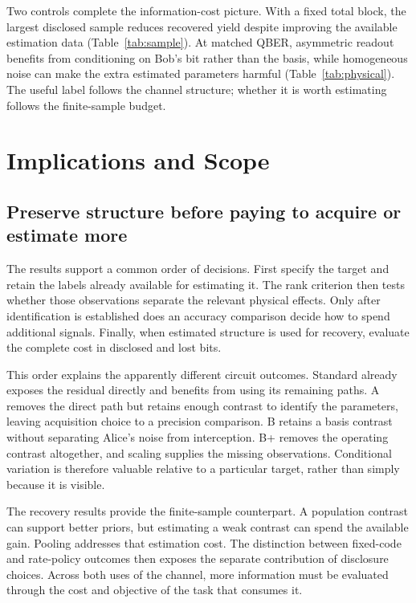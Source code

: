 \documentclass[manuscript,screen,review,anonymous]{acmart}
\begin{document}
Two controls complete the information-cost picture. With a fixed total block,
the largest disclosed sample reduces recovered yield despite improving the
available estimation data (Table~\ref{tab:sample}). At matched QBER,
asymmetric readout benefits from conditioning on Bob's bit rather than the
basis, while homogeneous noise can make the extra estimated parameters
harmful (Table~\ref{tab:physical}). The useful label follows the channel
structure; whether it is worth estimating follows the finite-sample budget.

\FloatBarrier
\section{Implications and Scope}
\label{sec:discussion}
\subsection{Preserve structure before paying to acquire or estimate more}
The results support a common order of decisions. First specify the target and
retain the labels already available for estimating it. The rank criterion then
tests whether those observations separate the relevant physical effects.
Only after identification is established does an accuracy comparison decide
how to spend additional signals. Finally, when estimated structure is used
for recovery, evaluate the complete cost in disclosed and lost bits.

This order explains the apparently different circuit outcomes. Standard
already exposes the residual directly and benefits from using its remaining
paths. A removes the direct path but retains enough contrast to identify the
parameters, leaving acquisition choice to a precision comparison.
B retains a basis contrast without separating Alice's noise from interception.
B+ removes the operating contrast altogether, and scaling supplies the
missing observations. Conditional variation is therefore valuable relative
to a particular target, rather than simply because it is visible.

The recovery results provide the finite-sample counterpart. A population
contrast can support better priors, but estimating a weak contrast can
spend the available gain. Pooling addresses that estimation cost.
The distinction between fixed-code and rate-policy outcomes then exposes
the separate contribution of disclosure choices. Across both uses of the
channel, more information must be evaluated through the cost and objective
of the task that consumes it.
\end{document}
